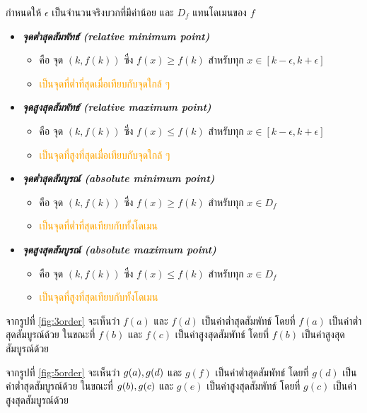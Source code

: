 \documentclass[hidelinks,12pt,a4paper]{article}
\newcommand{\s}{\space}
\begin{document}
กำหนดให้ $\epsilon$ เป็นจำนวนจริงบวกที่มีค่าน้อย และ $D_f$ แทนโดเมนของ $f$
\begin{itemize}
    \item \textbf{\emph{จุดต่ำสุดสัมพัทธ์ (relative minimum point)}} 
    \begin{itemize}
        \item คือ จุด $(k,f(k))$ ซึ่ง $f(x)\geq f(k)$ สำหรับทุก $x\in[k-\epsilon,k+\epsilon]$
        \item \textcolor{orange}{เป็นจุดที่ต่ำที่สุดเมื่อเทียบกับจุดใกล้ ๆ}
    \end{itemize}
    \item \textbf{\emph{จุดสูงสุดสัมพัทธ์ (relative maximum point)}} 
    \begin{itemize}
        \item คือ จุด $(k,f(k))$ ซึ่ง $f(x)\leq f(k)$ สำหรับทุก $x\in[k-\epsilon,k+\epsilon]$
        \item \textcolor{orange}{เป็นจุดที่สูงที่สุดเมื่อเทียบกับจุดใกล้ ๆ}
    \end{itemize}
    \item \textbf{\emph{จุดต่ำสุดสัมบูรณ์ (absolute minimum point)}} 
    \begin{itemize}
        \item คือ จุด $(k,f(k))$ ซึ่ง $f(x)\geq f(k)$ สำหรับทุก $x\in D_f$
        \item \textcolor{orange}{เป็นจุดที่ต่ำที่สุดเทียบกับทั้งโดเมน}
    \end{itemize}
    \item \textbf{\emph{จุดสูงสุดสัมบูรณ์ (absolute maximum point)}} 
    \begin{itemize}
        \item คือ จุด $(k,f(k))$ ซึ่ง $f(x)\leq f(k)$ สำหรับทุก $x\in D_f$
        \item \textcolor{orange}{เป็นจุดที่สูงที่สุดเทียบกับทั้งโดเมน}
    \end{itemize}
\end{itemize}
จากรูปที่ \ref{fig:3order} จะเห็นว่า $f(a)$ และ $f(d)$ เป็นค่าต่ำสุดสัมพัทธ์ โดยที่ $f(a)$ เป็นค่าต่ำสุดสัมบูรณ์ด้วย ในขณะที่ $f(b)$ และ $f(c)$ เป็นค่าสูงสุดสัมพัทธ์ โดยที่ $f(b)$ เป็นค่าสูงสุดสัมบูรณ์ด้วย

จากรูปที่ \ref{fig:5order} จะเห็นว่า $g(a),\s g(d)$ และ $g(f)$ เป็นค่าต่ำสุดสัมพัทธ์ โดยที่ $g(d)$ เป็นค่าต่ำสุดสัมบูรณ์ด้วย ในขณะที่ $g(b),\s g(c)$ และ $g(e)$ เป็นค่าสูงสุดสัมพัทธ์ โดยที่ $g(c)$ เป็นค่าสูงสุดสัมบูรณ์ด้วย
\end{document}
